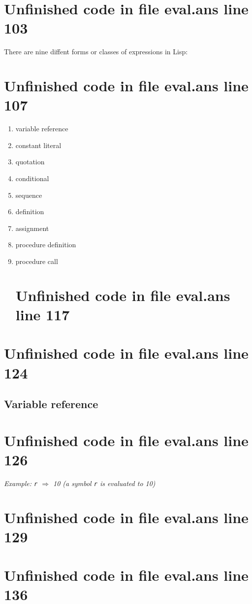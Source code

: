 \documentclass[twoside,9pt]{report}
\begin{document}
\section{Unfinished code in file eval.ans line 103}


There are nine diffent forms or classes of expressions in Lisp:

\section{Unfinished code in file eval.ans line 107}
\begin{enumerate}
\item  variable reference
\item  constant literal
\item  quotation
\item  conditional
\item  sequence
\item  definition
\item  assignment
\item  procedure definition
\item  procedure call
\section{Unfinished code in file eval.ans line 117}
\end{enumerate}
\section{Unfinished code in file eval.ans line 124}
\subsection{Variable reference}
\label{variable-reference}
\section{Unfinished code in file eval.ans line 126}


\emph{Example: \texttt{r} $\Rightarrow$ 10 (a symbol \texttt{r} is evaluated to 10)}

\section{Unfinished code in file eval.ans line 129}
\section{Unfinished code in file eval.ans line 136}
\end{document}
